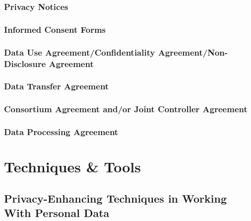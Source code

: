 \documentclass[
]{book}
\begin{document}
\hypertarget{privacy-notices}{%
\section{Privacy Notices}\label{privacy-notices}}

\hypertarget{informed-consent-forms}{%
\section{Informed Consent Forms}\label{informed-consent-forms}}

\hypertarget{data-use-agreementconfidentiality-agreementnon-disclosure-agreement}{%
\section{Data Use Agreement/Confidentiality Agreement/Non-Disclosure Agreement}\label{data-use-agreementconfidentiality-agreementnon-disclosure-agreement}}

\hypertarget{data-transfer-agreement}{%
\section{Data Transfer Agreement}\label{data-transfer-agreement}}

\hypertarget{consortium-agreement-andor-joint-controller-agreement}{%
\section{Consortium Agreement and/or Joint Controller Agreement}\label{consortium-agreement-andor-joint-controller-agreement}}

\hypertarget{data-processing-agreement}{%
\section*{Data Processing Agreement}\label{data-processing-agreement}}

\hypertarget{part-techniques-tools}{%
\part{Techniques \& Tools}\label{part-techniques-tools}}

\hypertarget{privacy-enchancing-techniques}{%
\chapter{Privacy-Enhancing Techniques in Working With Personal Data}\label{privacy-enchancing-techniques}}
\end{document}
